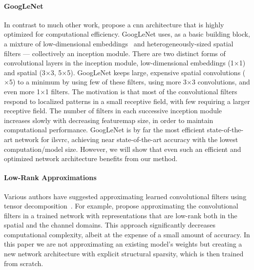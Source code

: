 \documentclass[thesis]{subfiles}
\begin{document}
	\paragraph{GoogLeNet} In contrast to much other work, \citet{Szegedy2014going} propose a \gls{cnn} architecture that is highly optimized for computational efficiency. GoogLeNet uses, as a basic building block, a mixture of low-dimensional embeddings~\citep{Lin2013NiN} and heterogeneously-sized spatial filters --- collectively an \Gls{inception} module. 
	There are two distinct forms of convolutional layers in the \gls{inception} module, low-dimensional embeddings (1$\times$1) and spatial (3$\times$3, 5$\times $5). GoogLeNet keeps large, expensive spatial convolutions ($\times$5) to a minimum by using few of these filters, using more 3$\times$3 convolutions, and even more 1$\times$1 filters. The motivation is that most of the convolutional filters respond to localized patterns in a small receptive field, with few requiring a larger receptive field. The number of filters in each successive \gls{inception} module increases slowly with decreasing \gls{featuremap} size, in order to maintain computational performance. GoogLeNet is by far the most efficient state-of-the-art network for \gls{ilsvrc}, achieving near state-of-the-art accuracy with the lowest computation/model size. However, we will show that even such an efficient and optimized network architecture benefits from our method.
	
	\paragraph{Low-Rank Approximations}
	Various authors have suggested approximating learned convolutional filters using tensor decomposition~\citep{journals/corr/JaderbergVZ14,journals/corr/LebedevGROL14,Kim2016}. For example, \citet{journals/corr/JaderbergVZ14} propose approximating the convolutional filters in a trained network with representations that are low-rank both in the spatial and the channel domains. This approach significantly decreases computational complexity, albeit at the expense of a small amount of accuracy. In this paper we are not approximating an existing model's weights but creating a new network architecture with explicit structural sparsity, which is then trained from scratch.
	
\end{document}
